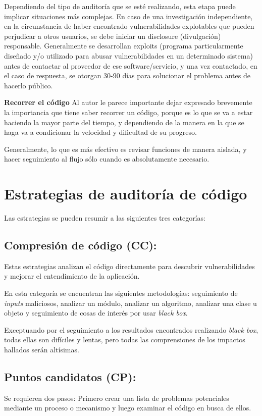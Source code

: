 Dependiendo del tipo de auditoría que se esté realizando, esta etapa puede implicar situaciones más complejas. En caso de una investigación independiente, en la circunstancia de haber encontrado vulnerabilidades explotables que pueden perjudicar a otros usuarios, se debe iniciar un disclosure (divulgación) responsable. Generalmente se desarrollan exploits (programa particularmente diseñado y/o utilizado para abusar vulnerabilidades en un determinado sistema) antes de contactar al proveedor de ese software/servicio, y una vez contactado, en el caso de respuesta, se otorgan 30-90 días para solucionar el problema antes de hacerlo público.

\begin{notesBox}
    \textbf{Recorrer el código}
    Al autor le parece importante dejar expresado brevemente la importancia que tiene saber recorrer un código, porque es lo que se va a estar haciendo la mayor parte del tiempo, y dependiendo de la manera en la que se haga va a condicionar la velocidad y dificultad de su progreso.

    Generalmente, lo que es más efectivo es revisar funciones de manera aislada, y hacer seguimiento al flujo sólo cuando es absolutamente necesario.

\end{notesBox}

\section{Estrategias de auditoría de código}
Las estrategias se pueden resumir a las siguientes tres categorías:

\subsection{Compresión de código (CC):}
Estas estrategias analizan el código directamente para descubrir vulnerabilidades y mejorar el entendimiento de la aplicación.

En esta categoría se encuentran las siguientes metodologías: seguimiento de \textit{inputs} maliciosos, analizar un módulo, analizar un algoritmo, analizar una clase u objeto y seguimiento de cosas de interés por usar \textit{black box}.

Exceptuando por el seguimiento a los resultados encontrados realizando \textit{black box}, todas ellas son difíciles y lentas, pero todas las comprensiones de los impactos hallados serán altísimas.

\subsection{Puntos candidatos (CP):}
Se requieren dos pasos: Primero crear una lista de problemas potenciales mediante un proceso o mecanismo y luego examinar el código en busca de ellos.

